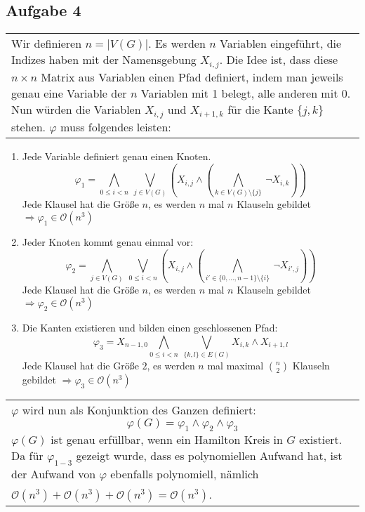 \documentclass[a4paper,10pt]{article}
\newcommand{\tabspace}{15cm}
\begin{document}
\subsection*{Aufgabe 4}
\begin{tabular}{@{} p{\tabspace}}
Wir definieren $n = |V(G)|$. Es werden $n$ Variablen eingeführt, die Indizes haben mit der Namensgebung $X_{i,j}$. Die Idee ist, dass diese $n \times n$ Matrix aus Variablen einen Pfad definiert, indem man jeweils genau eine Variable der $n$ Variablen mit 1 belegt, alle anderen mit 0. Nun würden die Variablen $X_{i,j}$ und $X_{i+1,k}$ für die Kante $\{j,k\}$ stehen. $\varphi$ muss folgendes leisten:
\end{tabular}
\begin{enumerate}
	\item 	Jede Variable definiert genau einen Knoten.
		\[\varphi_1 = \bigwedge_{0 \le i < n } ~\bigvee_{j \in {V(G)}} \left( X_{i,j} \land \left( \bigwedge_{k \in V(G)\setminus\{ j\}} ~ \lnot X_{i,k} \right) \right) \]
		Jede Klausel hat die Größe $n$, es werden $n$ mal $n$ Klauseln gebildet $\Rightarrow \varphi_1 \in \mathcal{O}(n^3)$
	\item 	Jeder Knoten kommt genau einmal vor:
		\[\varphi_2 = \bigwedge_{j \in {V(G)}} ~\bigvee_{0 \le i < n } \left( X_{i,j} \land \left( \bigwedge_{i' \in \{0,...,n-1 \}\setminus\{ i\}} ~ \lnot X_{i',j} \right) \right)\]
		Jede Klausel hat die Größe $n$, es werden $n$ mal $n$ Klauseln gebildet $\Rightarrow \varphi_2 \in \mathcal{O}(n^3)$
	\item  	Die Kanten existieren und bilden einen geschlossenen Pfad:
		\[\varphi_3 = X_{n-1,0}\bigwedge_{0 \le i <n}~ \bigvee_{\{k,l\} \in E(G)} X_{i,k} \land X_{i+1,l}  \]
		Jede Klausel hat die Größe $2$, es werden $n$ mal maximal $\binom{n}{2}$ Klauseln gebildet $\Rightarrow \varphi_3 \in \mathcal{O}(n^3)$
\end{enumerate}
\begin{tabular}{@{} p{\tabspace}}
$\varphi$ wird nun als Konjunktion des Ganzen definiert: \[\varphi(G) = \varphi_1 \land \varphi_2 \land \varphi_3 \] 
$\varphi(G)$ ist genau erfüllbar, wenn ein Hamilton Kreis in $G$ existiert. Da für $\varphi_{1-3}$ gezeigt wurde, dass es polynomiellen Aufwand hat, ist der Aufwand von $\varphi$ ebenfalls polynomiell, nämlich\\
$\mathcal{O}(n^3) + \mathcal{O}(n^3) + \mathcal{O}(n^3) = \mathcal{O}(n^3)$.

\end{tabular}
\end{document}
